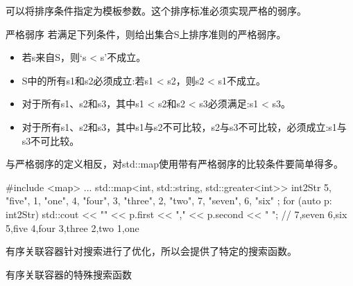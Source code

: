 可以将排序条件指定为模板参数。这个排序标准必须实现严格的弱序。

\begin{myNotic}{严格弱序}
若满足下列条件，则给出集合S上排序准则的严格弱序。

\begin{itemize}
\item 
若s来自S，则‘s < s’不成立。

\item 
S中的所有s1和s2必须成立:若s1 < s2，则s2 < s1不成立。

\item 
对于所有s1、s2和s3，其中s1 < s2和s2 < s3必须满足:s1 < s3。

\item 
对于所有s1、s2和s3，其中s1与s2不可比较，s2与s3不可比较，必须成立:s1与s3不可比较。
\end{itemize}
\end{myNotic}

与严格弱序的定义相反，对std::map使用带有严格弱序的比较条件要简单得多。

\begin{cpp}
#include <map>
...
std::map<int, std::string, std::greater<int>> int2Str{
	{5, "five"}, {1, "one"}, {4, "four"}, {3, "three"},
	{2, "two"}, {7, "seven"}, {6, "six"} };
for (auto p: int2Str) std::cout << "{" << p.first << "," << p.second << "} ";
	// {7,seven} {6,six} {5,five} {4,four} {3,three} {2,two} {1,one}
\end{cpp}


有序关联容器针对搜索进行了优化，所以会提供了特定的搜索函数。

\begin{center}
有序关联容器的特殊搜索函数
\end{center}

